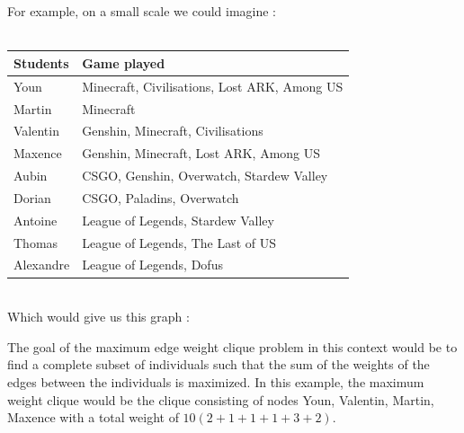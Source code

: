 \documentclass{article}
\begin{document}
    \\ \\
    For example, on a small scale we could imagine :
    \\ \\
    \begin{tabular}{|p{10em}|p{35em}|}
        \hline
        \textbf{Students} & \textbf{Game played} \\
        \hline
        Youn & Minecraft, Civilisations, Lost ARK, Among US \\
        \hline
        Martin & Minecraft \\
        \hline
        Valentin & Genshin, Minecraft, Civilisations \\
        \hline
        Maxence & Genshin, Minecraft, Lost ARK, Among US \\
        \hline
        Aubin & CSGO, Genshin, Overwatch, Stardew Valley\\
        \hline
        Dorian & CSGO, Paladins, Overwatch \\
        \hline
        Antoine & League of Legends, Stardew Valley \\
        \hline
        Thomas & League of Legends, The Last of US \\
        \hline
        Alexandre & League of Legends, Dofus \\
        \hline
    \end{tabular}
    \vspace{1\baselineskip} \\
    Which would give us this graph :

    \begin{center}
    \end{center}
    The goal of the maximum edge weight clique problem in this context would be to find a complete subset of individuals such that the sum of the weights of the edges between the individuals is maximized. In this example, the maximum weight clique would be the clique consisting of nodes Youn, Valentin, Martin, Maxence with a total weight of $10(2+1+1+1+3+2)$.
\end{document}
